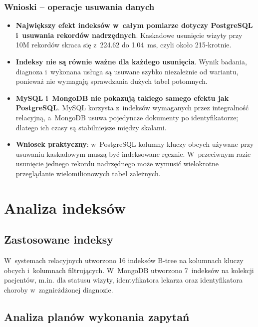 \documentclass[12pt,a4paper]{article}
\begin{document}
\subsubsection*{Wnioski -- operacje usuwania danych}

\begin{itemize}[noitemsep]
    \item \textbf{Największy efekt indeksów w~całym pomiarze dotyczy PostgreSQL i~usuwania rekordów nadrzędnych}. Kaskadowe usunięcie wizyty przy 10M rekordów skraca się z~224.62 do 1.04~ms, czyli około 215-krotnie.
    \item \textbf{Indeksy nie są równie ważne dla każdego usunięcia}. Wynik badania, diagnoza i~wykonana usługa są usuwane szybko niezależnie od wariantu, ponieważ nie wymagają sprawdzania dużych tabel potomnych.
    \item \textbf{MySQL i~MongoDB nie pokazują takiego samego efektu jak PostgreSQL}. MySQL korzysta z~indeksów wymaganych przez integralność relacyjną, a~MongoDB usuwa pojedyncze dokumenty po identyfikatorze; dlatego ich czasy są stabilniejsze między skalami.
    \item \textbf{Wniosek praktyczny}: w~PostgreSQL kolumny kluczy obcych używane przy usuwaniu kaskadowym muszą być indeksowane ręcznie. W~przeciwnym razie usunięcie jednego rekordu nadrzędnego może wymusić wielokrotne przeglądanie wielomilionowych tabel zależnych.
\end{itemize}


\section{Analiza indeksów}

\subsection{Zastosowane indeksy}

W~systemach relacyjnych utworzono 16 indeksów B-tree na kolumnach kluczy obcych i~kolumnach filtrujących. W~MongoDB utworzono 7~indeksów na kolekcji pacjentów, m.in. dla statusu wizyty, identyfikatora lekarza oraz identyfikatora choroby w~zagnieżdżonej diagnozie.

\subsection{Analiza planów wykonania zapytań}
\label{sec:explain}
\end{document}
